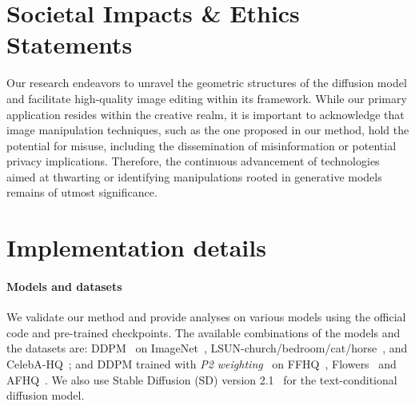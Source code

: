 \appendix
\onecolumn

\renewcommand{\thetable}{A\arabic{table}}
\renewcommand{\thefigure}{A\arabic{figure}}
\setcounter{figure}{0}
\setcounter{table}{0}
\renewcommand{\theHtable}{A\arabic{table}}
\renewcommand{\theHfigure}{A\arabic{figure}}

\section{Societal Impacts \& Ethics Statements}
\label{appendix:social_impact}
Our research endeavors to unravel the geometric structures of the diffusion model and facilitate high-quality image editing within its framework. While our primary application resides within the creative realm, it is important to acknowledge that image manipulation techniques, such as the one proposed in our method, hold the potential for misuse, including the dissemination of misinformation or potential privacy implications. Therefore, the continuous advancement of technologies aimed at thwarting or identifying manipulations rooted in generative models remains of utmost significance.



\section{Implementation details}
\label{appendix:implementation_detail}

\paragraph{Models and datasets}
We validate our method and provide analyses on various models using the official code and pre-trained checkpoints. The available combinations of the models and the datasets are: 
DDPM~\cite{ho2020denoising} on ImageNet~\cite{deng2009imagenet}, LSUN-church/bedroom/cat/horse~\cite{yu2015lsun}, and CelebA-HQ~\cite{karras2018progressive}; and DDPM trained with {\it P2 weighting}~\cite{choi2022perception} on FFHQ~\cite{karras2019style}, Flowers~\cite{yu2015lsun} and AFHQ~\cite{choi2020stargan}. We also use Stable Diffusion (SD) version 2.1~\cite{rombach2022high} for the text-conditional diffusion model.

